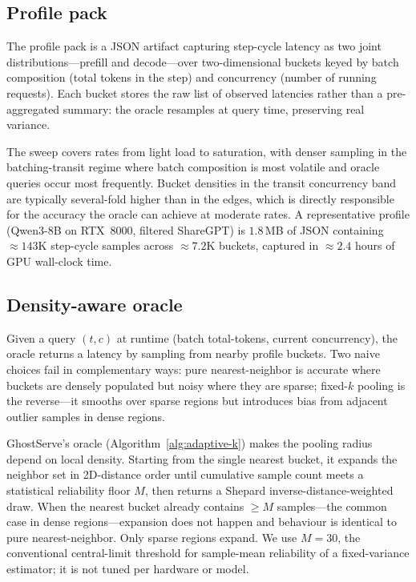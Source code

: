 \documentclass[conference]{IEEEtran}
\newcommand{\sysname}{GhostServe}
\begin{document}
\subsection{Profile pack}
\label{sec:design-profile}
The profile pack is a JSON artifact capturing step-cycle latency as
two joint distributions---prefill and decode---over two-dimensional
buckets keyed by batch composition (total tokens in the step) and
concurrency (number of running requests). Each bucket stores the raw
list of observed latencies rather than a pre-aggregated summary: the
oracle resamples at query time, preserving real variance.

The sweep covers rates from light load to saturation, with denser
sampling in the batching-transit regime where batch composition is
most volatile and oracle queries occur most frequently. Bucket
densities in the transit concurrency band are typically several-fold
higher than in the edges, which is directly responsible for the
accuracy the oracle can achieve at moderate rates. A representative
profile (Qwen3-8B on RTX~8000, filtered ShareGPT) is
$1.8$\,MB of JSON containing ${\approx}143$K step-cycle samples
across ${\approx}7.2$K buckets, captured in ${\approx}2.4$ hours of
GPU wall-clock time.

\subsection{Density-aware oracle}
\label{sec:design-oracle}

Given a query $(t, c)$ at runtime (batch total-tokens, current
concurrency), the oracle returns a latency by sampling from nearby
profile buckets. Two naive choices fail in complementary ways: pure
nearest-neighbor is accurate where buckets are densely populated but
noisy where they are sparse; fixed-$k$ pooling is the reverse---it
smooths over sparse regions but introduces bias from adjacent
outlier samples in dense regions.

\sysname{}'s oracle (Algorithm~\ref{alg:adaptive-k}) makes the
pooling radius depend on local density. Starting from the single
nearest bucket, it expands the neighbor set in 2D-distance order
until cumulative sample count meets a statistical reliability floor
$M$, then returns a Shepard inverse-distance-weighted draw. When the
nearest bucket already contains $\ge M$ samples---the common case in
dense regions---expansion does not happen and behaviour is identical
to pure nearest-neighbor. Only sparse regions expand. We use
$M\!=\!30$, the conventional central-limit threshold for
sample-mean reliability of a fixed-variance estimator; it is not
tuned per hardware or model.
\end{document}

